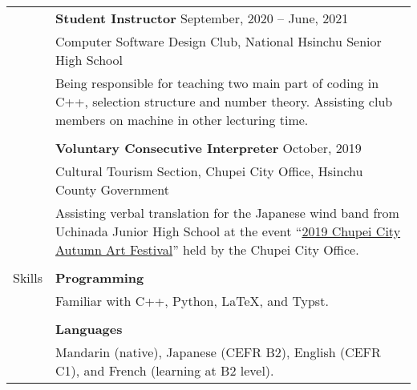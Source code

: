 \documentclass[letterpaper, 11pt]{article}
\begin{document}
\begin{center}
\begin{longtable}{p{0.76in}p{5.93in}}
        & \textbf{Student Instructor} \hfill September, 2020 -- June, 2021 \\
        & Computer Software Design Club, National Hsinchu Senior High School\\
        & Being responsible for teaching two main part of coding in C++, selection structure and number theory. Assisting club members on machine in other lecturing time.\\
        & \\

        & \textbf{Voluntary Consecutive Interpreter} \hfill October, 2019\\
        & Cultural Tourism Section, Chupei City Office, Hsinchu County Government\\
        & Assisting verbal translation for the Japanese wind band from Uchinada Junior High School at the event ``\href{https://www.zhubei.gov.tw/travel/p2_1_2.php?bigact_id=111}{2019 Chupei City Autumn Art Festival}'' held by the Chupei City Office.\\
        & \\
        
        
        {\textcolor{OliveGreen}{Skills}} 
        & \textbf{Programming}\\
        & Familiar with C++, Python, \LaTeX, and Typst. \\
        & \\
        
        & \textbf{Languages} \\
        & Mandarin (native), Japanese (CEFR B2), English (CEFR C1), and French (learning at B2 level). \\
        
        
    \end{longtable}
\end{center}
\end{document}

